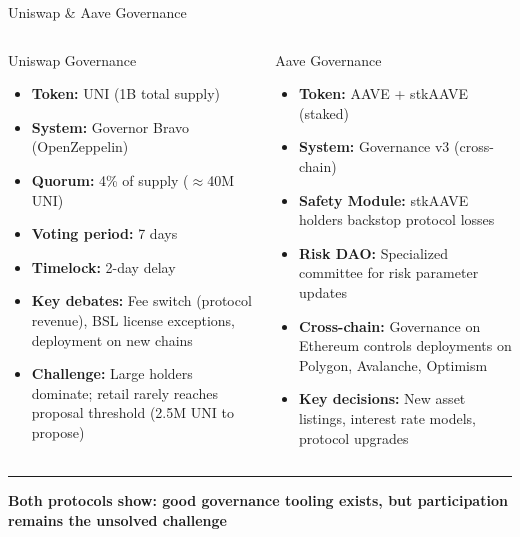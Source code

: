 \documentclass[8pt,aspectratio=169]{beamer}
\newcommand{\bottomnote}[1]{\vfill\vspace{-2mm}\textcolor{mllavender2}{\rule{\textwidth}{0.4pt}}\vspace{1mm}\footnotesize\textbf{#1}}
\begin{document}
\begin{frame}{Uniswap \& Aave Governance}
\begin{columns}[t]
\begin{block}{Uniswap Governance}
\begin{itemize}\small
  \item \textbf{Token:} UNI (1B total supply)
  \item \textbf{System:} Governor Bravo (OpenZeppelin)
  \item \textbf{Quorum:} 4\% of supply ($\approx$40M UNI)
  \item \textbf{Voting period:} 7 days
  \item \textbf{Timelock:} 2-day delay
  \item \textbf{Key debates:} Fee switch (protocol revenue), BSL license exceptions, deployment on new chains
  \item \textbf{Challenge:} Large holders dominate; retail rarely reaches proposal threshold (2.5M UNI to propose)
\end{itemize}
\end{block}
\begin{block}{Aave Governance}
\begin{itemize}\small
  \item \textbf{Token:} AAVE + stkAAVE (staked)
  \item \textbf{System:} Governance v3 (cross-chain)
  \item \textbf{Safety Module:} stkAAVE holders backstop protocol losses
  \item \textbf{Risk DAO:} Specialized committee for risk parameter updates
  \item \textbf{Cross-chain:} Governance on Ethereum controls deployments on Polygon, Avalanche, Optimism
  \item \textbf{Key decisions:} New asset listings, interest rate models, protocol upgrades
\end{itemize}
\end{block}
\end{columns}
\vspace{2pt}
\begin{center}
\end{center}
\bottomnote{Both protocols show: good governance tooling exists, but participation remains the unsolved challenge}
\end{frame}
\end{document}
